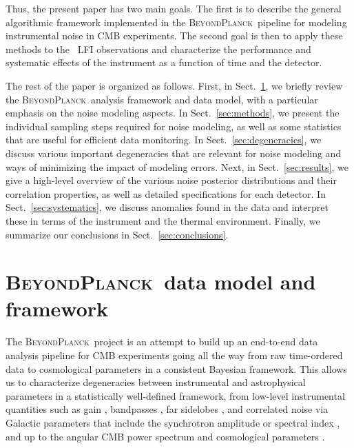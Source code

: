 \documentclass{aa}
\newcommand{\BP}{\textsc{BeyondPlanck}}
\begin{document}
Thus, the present paper has two main goals. The first is to describe
the general algorithmic framework implemented in the \BP\ pipeline for
modeling instrumental noise in CMB experiments. The second goal is
then to apply these methods to the \Planck\ LFI observations and
characterize the performance and systematic effects of the instrument
as a function of time and the detector.

The rest of the paper is organized as follows. First, in
Sect.~\ref{sec:bp}, we briefly review the \BP\ analysis framework and
data model, with a particular emphasis on the noise modeling aspects. In
Sect.~\ref{sec:methods}, we present the individual sampling steps
required for noise modeling, as well as some statistics that are useful
for efficient data monitoring. In Sect.~\ref{sec:degeneracies}, we
discuss various important degeneracies that are relevant for noise modeling 
and ways of minimizing the impact of modeling errors. Next, in
Sect.~\ref{sec:results}, we give a high-level overview of the various
noise posterior distributions and their correlation
properties, as well as detailed specifications for each detector. In
Sect.~\ref{sec:systematics}, we discuss anomalies found in the data
and interpret these in terms of the instrument and the thermal
environment. Finally, we summarize our conclusions in
Sect.~\ref{sec:conclusions}.



\section{\BP\ data model and framework}
\label{sec:bp}
The \BP\ project is an attempt to build up an end-to-end data analysis
pipeline for CMB experiments going all the way from raw time-ordered
data to cosmological parameters in a consistent Bayesian
framework. This allows us to characterize degeneracies between
instrumental and astrophysical parameters in a statistically
well-defined framework, from low-level instrumental quantities such as
gain \citep{bp07}, bandpasses \citep{bp09}, far sidelobes \citep{bp08}, and correlated noise via Galactic parameters that include
the synchrotron amplitude or spectral index \citep{bp13,bp14}, and up to the angular
CMB power spectrum and cosmological parameters \citep{bp11,bp12}.
\end{document}
